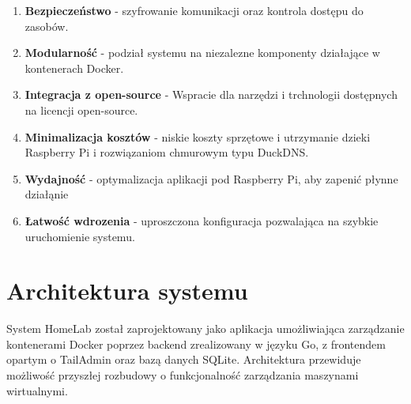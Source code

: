 \begin{enumerate}
    \item \textbf{Bezpieczeństwo} - szyfrowanie komunikacji oraz kontrola dostępu do zasobów.
    \item \textbf{Modularność} - podział systemu na niezalezne komponenty działające w kontenerach Docker.
    \item \textbf{Integracja z open-source} - Wspracie dla narzędzi i trchnologii dostępnych na licencji open-source.
    \item \textbf{Minimalizacja kosztów} - niskie koszty sprzętowe i utrzymanie dzieki Raspberry Pi i rozwiązaniom chmurowym typu DuckDNS.
    \item \textbf{Wydajność} - optymalizacja aplikacji pod Raspberry Pi, aby zapenić płynne działąnie 
    \item \textbf{Łatwość wdrozenia} - uproszczona konfiguracja pozwalająca na szybkie uruchomienie systemu.
\end{enumerate}

\pagebreak

\section{Architektura systemu}
System HomeLab został zaprojektowany jako aplikacja umożliwiająca zarządzanie kontenerami Docker poprzez backend zrealizowany w języku Go, z frontendem opartym o TailAdmin oraz bazą danych SQLite. Architektura przewiduje możliwość przyszłej rozbudowy o funkcjonalność zarządzania maszynami wirtualnymi.

